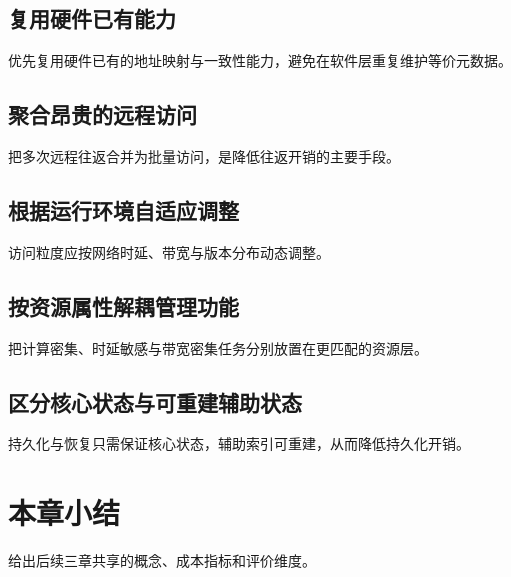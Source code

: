 \subsection{复用硬件已有能力}
优先复用硬件已有的地址映射与一致性能力，避免在软件层重复维护等价元数据\cite{liCtfs2022,marmolLibpm2018}。
\subsection{聚合昂贵的远程访问}
把多次远程往返合并为批量访问，是降低往返开销的主要手段\cite{caiEfficient2018,weiCharacterizing2021}。
\subsection{根据运行环境自适应调整}
访问粒度应按网络时延、带宽与版本分布动态调整\cite{binnigEnd2016,zamanianChiller2020}。
\subsection{按资源属性解耦管理功能}
把计算密集、时延敏感与带宽密集任务分别放置在更匹配的资源层\cite{caoPolardb2021,zhangTowards2021}。
\subsection{区分核心状态与可重建辅助状态}
持久化与恢复只需保证核心状态，辅助索引可重建，从而降低持久化开销\cite{correiaRomulus2018,assaTl4x2023}。

\section{本章小结}
给出后续三章共享的概念、成本指标和评价维度。
